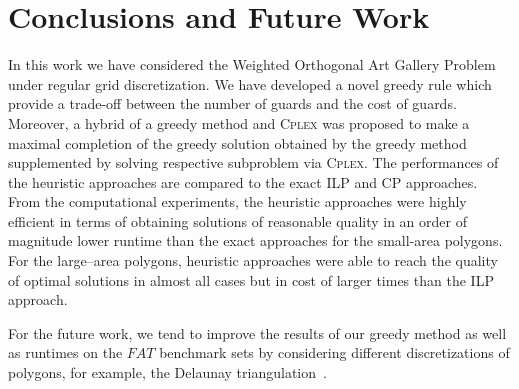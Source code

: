 \documentclass[runningheads,a4paper]{elsarticle}
\begin{document}
	\section{Conclusions and Future Work}
	  In this work we have considered the Weighted Orthogonal Art Gallery Problem under regular grid discretization.
	  We have developed a novel greedy rule which provide a trade-off between the number of guards and the cost of  guards. Moreover, a hybrid of a greedy method and \textsc{Cplex} was proposed to make a maximal completion of the greedy solution obtained by the greedy method supplemented by solving respective subproblem via \textsc{Cplex}. The performances of the heuristic approaches are compared to the exact ILP and CP approaches. From the computational experiments, the heuristic approaches were highly efficient in terms of obtaining solutions of reasonable quality in an order of magnitude lower runtime than the exact approaches for the small-area polygons. For the large--area polygons, heuristic approaches were able to reach the quality of optimal solutions in almost all cases but in cost of larger times than the ILP approach.
	
	  For the future work, we tend to improve the results of our greedy method as well as runtimes on the $FAT$ benchmark sets by considering different discretizations of polygons, for example, the Delaunay triangulation~\cite{lee1980two}.
	
	
	
	
	
	
	
	
	
	
\end{document}
